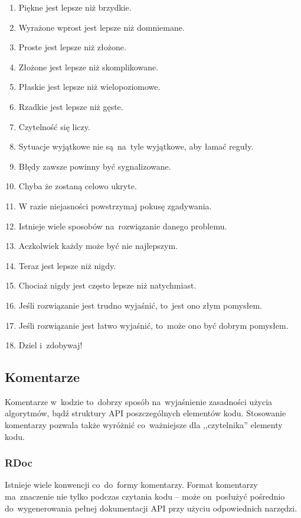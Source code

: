 \begin{enumerate}
  \item Piękne jest lepsze niż brzydkie.
  \item Wyrażone wprost jest lepsze niż domniemane.
  \item Proste jest lepsze niż złożone.
  \item Złożone jest lepsze niż skomplikowane.
  \item Płaskie jest lepsze niż wielopoziomowe.
  \item Rzadkie jest lepsze niż gęste.
  \item Czytelność się liczy.
  \item Sytuacje wyjątkowe nie są~na~tyle wyjątkowe, aby łamać reguły.
  \item Błędy zawsze powinny być sygnalizowane.
  \item Chyba że zostaną celowo ukryte.
  \item W razie niejasności powstrzymaj pokusę zgadywania.
  \item Istnieje wiele sposobów na~rozwiązanie danego problemu.
  \item Aczkolwiek każdy może być nie najlepszym.
  \item Teraz jest lepsze niż nigdy.
  \item Chociaż nigdy jest często lepsze niż natychmiast.
  \item Jeśli rozwiązanie jest trudno wyjaśnić, to~jest ono złym pomysłem.
  \item Jeśli rozwiązanie jest łatwo wyjaśnić, to~może ono być dobrym pomysłem.
  \item Dziel i~zdobywaj!
\end{enumerate}

\subsection{Komentarze} \label{dokumentacja.komentarze}

Komentarze w~kodzie to~dobrzy sposób na~wyjaśnienie zasadności użycia algorytmów, bądź struktury API poszczególnych elementów kodu. Stosowanie komentarzy pozwala także wyróżnić co~ważniejsze dla ,,czytelnika'' elementy kodu.

\subsubsection{RDoc} \label{dokumentacja.rdoc}

Istnieje wiele konwencji co~do~formy komentarzy. Format komentarzy ma~znaczenie nie tylko podczas czytania kodu -- może on~posłużyć pośrednio do~wygenerowania pełnej dokumentacji API przy użyciu odpowiednich narzędzi.


